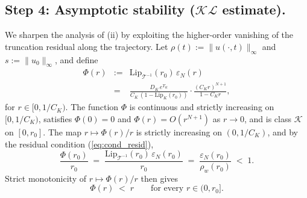 \documentclass[amsthm]{autart}
\theoremstyle{plain}
\theoremstyle{definition}
\newcommand{\Tcal}{\mathcal{T}}
\newcommand{\Lipk}{\mathrm{Lip}_K}
\newcommand{\LipT}{\mathrm{Lip}_{\Tcal^{-1}}}
\newcommand{\eps}{\varepsilon}
\begin{document}
\subsection*{Step 4: Asymptotic stability ($\mathcal{KL}$ estimate).}

We sharpen the analysis of (ii) by exploiting the higher-order vanishing of the truncation residual along the trajectory. Let $\rho(t) := \|u(\cdot,t)\|_\infty$ and $s := \|u_0\|_\infty$, and define
\begin{eqnarray}
\Phi(r) &:=& \LipT(r_0)\,\eps_N(r) \nonumber \\
&=& \frac{D_K\,e^{\Upsilon_K}}{C_K\,(1 - \Lipk(r_0))}\cdot\frac{(C_K r)^{N+1}}{1 - C_K r},
\label{eq:Phidef}
\end{eqnarray}
for $r \in [0, 1/C_K)$.
The function $\Phi$ is continuous and strictly increasing on $[0, 1/C_K)$, satisfies $\Phi(0) = 0$ and $\Phi(r) = O(r^{N+1})$ as $r \to 0$, and is class $\mathcal{K}$ on $[0, r_0]$. The map $r \mapsto \Phi(r)/r$ is strictly increasing on $(0, 1/C_K)$, and by the residual condition (\ref{eq:cond_resid}),
\begin{equation}
\frac{\Phi(r_0)}{r_0} \;=\; \frac{\LipT(r_0)\,\eps_N(r_0)}{r_0} \;=\; \frac{\eps_N(r_0)}{\rho_w(r_0)} \;<\; 1.
\label{eq:Phi_over_r_at_r0}
\end{equation}
Strict monotonicity of $r \mapsto \Phi(r)/r$ then gives
\begin{equation}
\Phi(r) \;<\; r \qquad \text{for every } r \in (0, r_0].
\label{eq:Phisubunity}
\end{equation}
\end{document}
